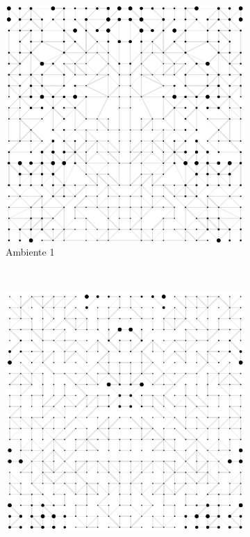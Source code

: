 \documentclass{llncs}
\begin{document}
\begin{figure}[!ht]
      \centering
      \begin{subfigure}[b]{0.48\textwidth}
              \includegraphics[width=\textwidth]{images/sim1.png}
              \caption{Ambiente 1}
              \label{fig:ambiente1}
      \end{subfigure}
      ~
      \begin{subfigure}[b]{0.48\textwidth}
              \includegraphics[width=\textwidth]{images/sim2.png}

\end{subfigure}
\end{figure}
\end{document}
